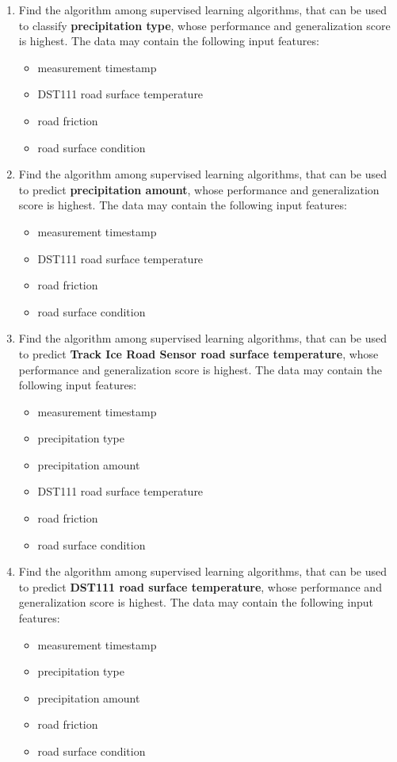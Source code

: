 	\begin{enumerate}
		\item Find the algorithm among supervised learning algorithms, that can be used to classify \textbf{precipitation type}, whose performance and generalization score is highest. The data may contain the following input features: 
			\begin{itemize}
				\item measurement timestamp
				\item DST111 road surface temperature
				\item road friction
				\item road surface condition
			\end{itemize}
		\item Find the algorithm among supervised learning algorithms, that can be used to predict \textbf{precipitation amount}, whose performance and generalization score is highest. The data may contain the following input features: 
			\begin{itemize}
				\item measurement timestamp
				\item DST111 road surface temperature
				\item road friction
				\item road surface condition
			\end{itemize}
		\item Find the algorithm among supervised learning algorithms, that can be used to predict \textbf{Track Ice Road Sensor road surface temperature}, whose performance and generalization score is highest. The data may contain the following input features: 
			\begin{itemize}
				\item measurement timestamp
				\item precipitation type
				\item precipitation amount
				\item DST111 road surface temperature
				\item road friction
				\item road surface condition
			\end{itemize}
		\item Find the algorithm among supervised learning algorithms, that can be used to predict \textbf{DST111 road surface temperature}, whose performance and generalization score is highest. The data may contain the following input features: 
			\begin{itemize}
				\item measurement timestamp
				\item precipitation type
				\item precipitation amount
				\item road friction
				\item road surface condition
			\end{itemize}
	\end{enumerate}

